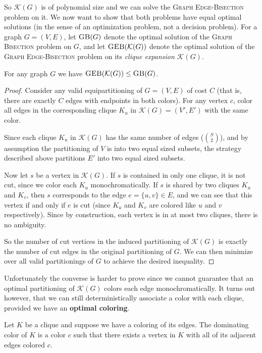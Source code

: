 \documentclass{article}
\newcommand{\gb}{\textsc{Graph \allowbreak Bisection} }
\newcommand{\geb}{\textsc{Graph \allowbreak Edge-\allowbreak Bisection} }
\newcommand{\sgeb}{\textsc{GEB} }
\newcommand{\sgb}{\textsc{GB} }
\begin{document}
	So $\mathcal{K}(G)$ is of polynomial size and we can solve the \geb problem
	on it. We now want to show that both problems have equal optimal solutions (in
	the sense of an optimization problem, not a decision problem). For
	a graph $G=(V, E)$, let $\sgb(G)$ denote the optimal solution of the \gb
	problem on $G$, and let $\sgeb(\mathcal{K}(G))$ denote the optimal solution of
	the \geb problem on its \textit{clique expansion} $\mathcal{K}(G)$.

	\begin{proposition}
		\label{geb-leq-gb}
		For any graph $G$ we have $\sgeb(\mathcal{K}(G)) \leq \sgb(G)$.
	\end{proposition}
	\begin{proof}
		Consider any valid equipartitioning of $G = (V, E)$ of cost $C$ (that
		is, there are
		exactly $C$ edges with endpoints in both colors). For any vertex $c$,
		color all edges in the corresponding clique $K_u$ in $\mathcal{K}(G)
			= (V', E')$ with the same color.

		Since each clique $K_u$ in $\mathcal{K}(G)$ has the same number of
		edges ($\binom{S}{2}$), and by
		assumption the partitioning of $V$ is into two equal sized subsets, the
		strategy described above partitions $E'$ into two equal sized subsets.

		Now let $s$ be a vertex in $\mathcal{K}(G)$. If $s$ is contained in only
		one clique, it is not cut,
		since we color each $K_u$ monochromatically. If $s$ is shared by two
		cliques $K_u$ and $K_v$, then $s$ corresponds to the edge
		$e = \{u, v\} \in E$, and
		we can see that this vertex if and only if $e$ is cut (since $K_u$ and
		$K_v$ are colored like $u$ and $v$ respectively). Since by construction,
		each vertex is in at most two cliques, there is no ambiguity.

		So the number of cut vertices in the induced partitioning of
		$\mathcal{K}(G)$ is exactly the number of cut edges in the original
		partitioning of $G$. We can then minimize over all valid partitionings
		of $G$ to achieve the desired inequality.
	\end{proof}

	Unfortunately the converse is harder to prove since we cannot guarantee
	that an optimal partitioning of $\mathcal{K}(G)$ colors each edge
	monochromatically. It turns
	out however, that we can still deterministically associate a color with each
	clique, provided we have an \textbf{optimal coloring}.

	\begin{definition}
		Let $K$ be a clique and suppose we have a coloring of its edges. The
		dominating color of $K$ is a color $c$ such that there exists a vertex
		in $K$ with all of its adjacent edges colored $c$.
	\end{definition}
\end{document}

